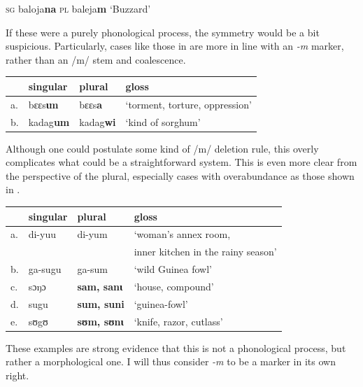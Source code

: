 \begin{exe}
    \ex \textsc{sg} baloja\textbf{na} \textsc{pl} baleja\textbf{m} `Buzzard'
\end{exe}

If these were a purely phonological process, the symmetry would be a bit suspicious. Particularly, cases like those in  are more in line with an \textit{-m} marker, rather than an /m/ stem and coalescence.

\begin{exe}
    \ex \label{except-m}
    \begin{tabular}[t]{llll}
      & singular & plural  & gloss                          \\
      \midrule
      a. & bɛɛs\textbf{ɩm}   & bɛɛs\textbf{a}   & `torment, torture, oppression' \\
      b. & kadag\textbf{um}  & kadag\textbf{wi} & `kind of sorghum'              \\
    \end{tabular}
\end{exe}

Although one could postulate some kind of /m/ deletion rule, this overly complicates what could be a straightforward system. This is even more clear from the perspective of the plural, especially cases with overabundance as those shown in .

\begin{exe}
    \ex \label{over-m}
    \begin{tabular}[t]{llll}
         & singular & plural             & gloss                              \\
      \midrule
      a. & di-yuu   & di-yum             & `woman's annex room,               \\
         &          &                    & inner kitchen in the rainy season' \\
      b. & ga-sugu  & ga-sum             & `wild Guinea fowl'                 \\
      c. & sɔŋɔ     & \textbf{sam, sanɩ} & `house, compound'                  \\
      d. & sugu     & \textbf{sum, suni} & `guinea-fowl'                      \\
      e. & sʊgʊ     & \textbf{sʊm, sʊnɩ} & `knife, razor, cutlass'            \\
    \end{tabular}
\end{exe}

These examples are strong evidence that this is not a phonological process, but rather a morphological one. I will thus consider \textit{-m} to be a marker in its own right.

